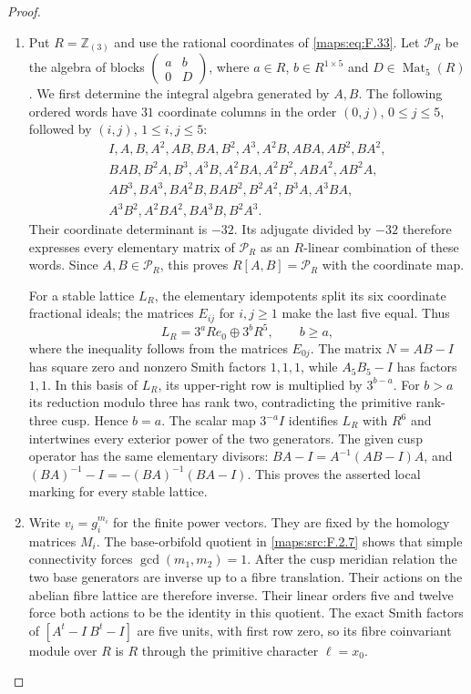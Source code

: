\documentclass[11pt,a4paper]{article}
\numberwithin{equation}{section}
\theoremstyle{definition}
\begin{document}
\begin{proof}
\begin{enumerate}[label=\arabic*.]
\item Put $R=\mathbb Z_{(3)}$ and use the rational coordinates of
\eqref{maps:eq:F.33}.  Let $\mathcal P_R$ be the algebra of blocks
$\left(\begin{smallmatrix}a&b\\0&D\end{smallmatrix}\right)$,
where $a\in R$, $b\in R^{1\times5}$ and $D\in\operatorname{Mat}_5(R)$.
We first determine the integral algebra generated by $A,B$.
The following ordered words have $31$ coordinate columns in the order
$(0,j)$, $0\leq j\leq5$, followed by $(i,j)$,
$1\leq i,j\leq5$:
\[
\begin{gathered}
I,A,B,A^2,AB,BA,B^2,A^3,A^2B,ABA,AB^2,BA^2,\\
BAB,B^2A,B^3,A^3B,A^2BA,A^2B^2,ABA^2,AB^2A,\\
AB^3,BA^3,BA^2B,BAB^2,B^2A^2,B^3A,A^3BA,\\
A^3B^2,A^2BA^2,BA^3B,B^2A^3.
\end{gathered}
\]
Their coordinate determinant is $-32$.  Its adjugate divided by
$-32$ therefore expresses every elementary matrix of
$\mathcal P_R$ as an $R$-linear combination of these words.
Since $A,B\in\mathcal P_R$, this proves
$R[A,B]=\mathcal P_R$ with the coordinate map.

For a stable lattice $L_R$, the elementary idempotents split its
six coordinate fractional ideals; the matrices $E_{ij}$ for
$i,j\geq1$ make the last five equal.  Thus
\[
 L_R=3^aRe_0\oplus3^bR^5,\qquad b\geq a,
\]
where the inequality follows from the matrices $E_{0j}$.
The matrix $N=AB-I$ has square zero and nonzero Smith factors
$1,1,1$, while $A_5B_5-I$ has factors $1,1$.
In this basis of $L_R$, its upper-right row is multiplied by
$3^{b-a}$.  For $b>a$ its reduction modulo three has rank two,
contradicting the primitive rank-three cusp.  Hence $b=a$.
The scalar map $3^{-a}I$ identifies $L_R$ with $R^6$
and intertwines every exterior power of the two generators.
The given cusp operator has the same elementary divisors:
$BA-I=A^{-1}(AB-I)A$, and
$(BA)^{-1}-I=-(BA)^{-1}(BA-I)$.
This proves the asserted local marking for every stable lattice.


\item Write $v_i=g_i^{m_i}$ for the finite power vectors.
They are fixed by the homology matrices $M_i$.
The base-orbifold quotient in \cref{maps:src:F.2.7} shows that
simple connectivity forces $\gcd(m_1,m_2)=1$.
After the cusp meridian relation the two base generators are
inverse up to a fibre translation.  Their actions on the abelian
fibre lattice are therefore inverse.  Their linear orders five
and twelve force both actions to be the identity in this quotient.
The exact Smith factors of $[A^t-I\ B^t-I]$ are five units,
with first row zero, so its fibre coinvariant module over $R$
is $R$ through the primitive character $\ell=x_0$.


\end{enumerate}
\end{proof}
\end{document}
